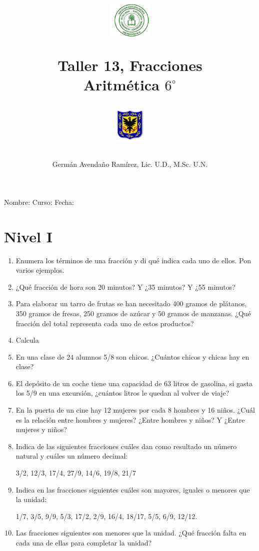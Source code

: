 \documentclass[10pt,twoside]{article}
\author{Germ\'an Avenda\~no Ram\'irez, Lic. U.D., M.Sc. U.N.}
\title{\begin{minipage}{.2\textwidth}
\includegraphics[height=1.75cm]{Images/logo-colegio.png}\end{minipage}
\begin{minipage}{.55\textwidth}
\begin{center}
Taller 13, Fracciones   \\
Aritmética $6^{\circ}$
\end{center}
\end{minipage}\hfill
\begin{minipage}{.2\textwidth}
\includegraphics[height=1.75cm]{Images/logo-sed.png} 
\end{minipage}}
\date{}
\begin{document}
\maketitle
Nombre: \hrulefill Curso: \underline{\hspace*{44pt}} Fecha: \underline{\hspace*{2.5cm}}
\section*{Nivel I}
\begin{enumerate}
 \item Enumera los términos de una fracción y di qué indica cada uno de ellos. Pon varios ejemplos.
\item ¿Qué fracción de hora son 20 minutos? Y ¿35 minutos? Y ¿55 minutos?
\item Para elaborar un tarro de frutas se han necesitado 400 gramos de plátanos, 350 gramos de fresas, 250 gramos de azúcar y 50 gramos de manzanas. ¿Qué fracción del total representa cada uno de estos productos?
\item Calcula
\begin{enumerate}
 \end{enumerate}
\item  En una clase de 24 alumnos 5/8 son chicos. ¿Cuántos chicos y chicas hay en clase?
\item El depósito de un coche tiene una capacidad de 63 litros de gasolina, si gasta los 5/9 en una excursión, ¿cuántos litros le quedan al volver de viaje?
\item En la puerta de un cine hay 12 mujeres por cada 8 hombres y 16 niños. ¿Cuál es la relación entre hombres y mujeres? ¿Entre hombres y niños? Y ¿Entre mujeres y niños?
\item Indica de las siguientes fracciones cuáles dan como resultado un número natural y cuáles un número decimal:

3/2, 12/3, 17/4, 27/9, 14/6, 19/8, 21/7
\item Indica en las fracciones siguientes cuáles son mayores, iguales o menores que la unidad:

1/7, 3/5, 9/9, 5/3, 17/2, 2/9, 16/4, 18/17, 5/5, 6/9, 12/12.
\item Las fracciones siguientes son menores que la unidad. ¿Qué fracción falta en cada una de ellas para completar la unidad?


\end{enumerate}
\end{document}
